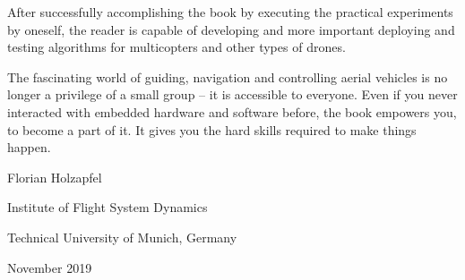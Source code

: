 After successfully accomplishing the book by executing the practical
experiments by oneself, the reader is capable of developing and more
important deploying and testing algorithms for multicopters and other
types of drones.

The fascinating world of guiding, navigation and controlling aerial
vehicles is no longer a privilege of a small group -- it is accessible
to everyone. Even if you never interacted with embedded hardware and
software before, the book empowers you, to become a part of it. It
gives you the hard skills required to make things happen.

\qquad{}\qquad{}\qquad{}\qquad{}\qquad{}\qquad{}\qquad{}\qquad{}\qquad{}\qquad{}\qquad{}\qquad{}\qquad{}Florian
Holzapfel 

\qquad{}\qquad{}\qquad{}\qquad{}\qquad{}\qquad{}\qquad{}\qquad{}\qquad{}\qquad{}\qquad{}Institute
of Flight System Dynamics 

\qquad{}\qquad{}\qquad{}\qquad{}\qquad{}\qquad{}\qquad{}\qquad{}\qquad{}\qquad{}Technical
University of Munich, Germany 

\qquad{}\qquad{}\qquad{}\qquad{}\qquad{}\qquad{}\qquad{}\qquad{}\qquad{}\qquad{}\qquad{}\qquad{}\qquad{}November
2019

